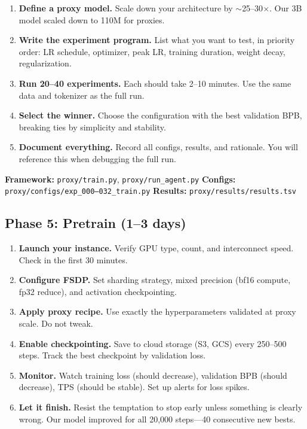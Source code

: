 \documentclass[11pt,a4paper]{article}
\begin{document}
\begin{enumerate}
    \item \textbf{Define a proxy model.} Scale down your architecture by $\sim$25--30$\times$. Our 3B model scaled down to 110M for proxies.
    
    \item \textbf{Write the experiment program.} List what you want to test, in priority order: LR schedule, optimizer, peak LR, training duration, weight decay, regularization.
    
    \item \textbf{Run 20--40 experiments.} Each should take 2--10 minutes. Use the same data and tokenizer as the full run.
    
    \item \textbf{Select the winner.} Choose the configuration with the best validation BPB, breaking ties by simplicity and stability.
    
    \item \textbf{Document everything.} Record all configs, results, and rationale. You will reference this when debugging the full run.
\end{enumerate}

\begin{reporef}
\textbf{Framework:} \texttt{proxy/train.py}, \texttt{proxy/run\_agent.py}\hfill
\textbf{Configs:} \texttt{proxy/configs/exp\_000--032\_train.py}\hfill
\textbf{Results:} \texttt{proxy/results/results.tsv}
\end{reporef}

\subsection{Phase 5: Pretrain (1--3 days)}

\begin{enumerate}
    \item \textbf{Launch your instance.} Verify GPU type, count, and interconnect speed. Check in the first 30 minutes.
    
    \item \textbf{Configure FSDP.} Set sharding strategy, mixed precision (bf16 compute, fp32 reduce), and activation checkpointing.
    
    \item \textbf{Apply proxy recipe.} Use exactly the hyperparameters validated at proxy scale. Do not tweak.
    
    \item \textbf{Enable checkpointing.} Save to cloud storage (S3, GCS) every 250--500 steps. Track the best checkpoint by validation loss.
    
    \item \textbf{Monitor.} Watch training loss (should decrease), validation BPB (should decrease), TPS (should be stable). Set up alerts for loss spikes.
    
    \item \textbf{Let it finish.} Resist the temptation to stop early unless something is clearly wrong. Our model improved for all 20,000 steps---40 consecutive new bests.
\end{enumerate}
\end{document}
